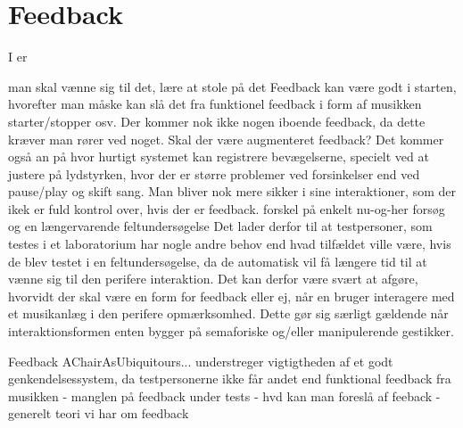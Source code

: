 \section{Feedback}
\label{DiskussionFeedback}
%
I  er 

man skal vænne sig til det, lære at stole på det
Feedback kan være godt i starten, hvorefter man måske kan slå det fra
funktionel feedback i form af musikken starter/stopper osv. 
Der kommer nok ikke nogen iboende feedback, da dette kræver man rører ved noget. 
Skal der være augmenteret feedback?
Det kommer også an på hvor hurtigt systemet kan registrere bevægelserne, specielt ved at justere på lydstyrken, hvor der er større problemer ved forsinkelser end ved pause/play og skift sang. 
Man bliver nok mere sikker i sine interaktioner, som der ikek er fuld kontrol over, hvis der er feedback. 
forskel på enkelt nu-og-her forsøg og en længervarende feltundersøgelse
Det lader derfor til at testpersoner, som testes i et laboratorium har nogle andre behov end hvad tilfældet ville være, hvis de blev testet i en feltundersøgelse, da de automatisk vil få længere tid til at vænne sig til den perifere interaktion. Det kan derfor være svært at afgøre, hvorvidt der skal være en form for feedback eller ej, når en bruger interagere med et musikanlæg i den perifere opmærksomhed. Dette gør sig særligt gældende når interaktionsformen enten bygger på semaforiske og/eller manipulerende gestikker.


Feedback
AChairAsUbiquitours... understreger vigtigtheden af et godt genkendelsessystem, da testpersonerne ikke får andet end funktional feedback fra musikken - manglen på feedback under tests - hvd kan man foreslå af feeback - generelt teori vi har om feedback
